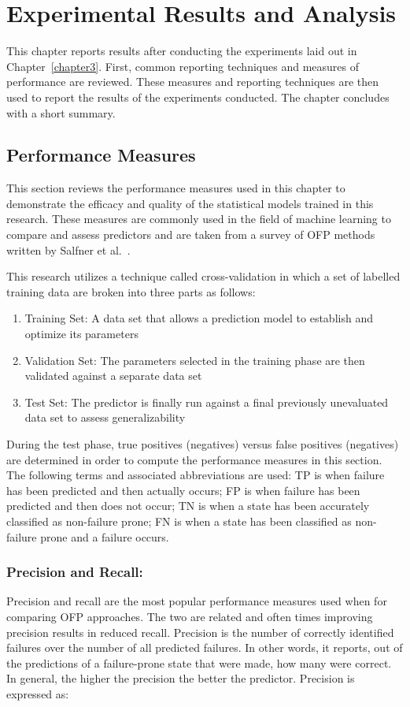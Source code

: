 \chapter{Experimental Results and Analysis} \label{chapter4}
This chapter reports results after conducting the experiments laid out in
Chapter~\ref{chapter3}.  First, common reporting techniques and measures of
performance are reviewed.  These measures and reporting techniques are then
used to report the results of the experiments conducted.  The chapter concludes
with a short summary.

\section{Performance Measures} \label{metrics}
This section reviews the performance measures used in this chapter to
demonstrate the efficacy and quality of the statistical models trained in this
research.  These measures are commonly used in the field of machine learning to
compare and assess predictors and are taken from a survey of \ac{OFP} methods
written by Salfner et al.~\cite{salfnerSurvey}.

This research utilizes a technique called cross-validation in which a set of
labelled training data are broken into three parts as follows:
\begin{enumerate}
\item{Training Set:  A data set that allows a prediction model to establish and
optimize its parameters}
\item{Validation Set:  The parameters selected in the training phase are then
validated against a separate data set}
\item{Test Set:  The predictor is finally run against a final previously
unevaluated data set to assess generalizability}
\end{enumerate}
During the test phase, true positives (negatives) versus false positives
(negatives) are determined in order to compute the performance measures in this
section.  The following terms and associated abbreviations are used: \ac{TP} is
when failure has been predicted and then actually occurs; \ac{FP} is when
failure has been predicted and then does not occur; \ac{TN} is when a state has
been accurately classified as non-failure prone; \ac{FN} is when a state has
been classified as non-failure prone and a failure occurs.

\subsection{Precision and Recall:}
Precision and recall are the most popular performance measures used when
for comparing \ac{OFP} approaches.  The two are related and often times
improving precision results in reduced recall.  Precision is the number of
correctly identified failures over the number of all predicted failures.  In
other words, it reports, out of the predictions of a failure-prone state that
were made, how many were correct.  In general, the higher the precision the
better the predictor.  Precision is expressed as:

